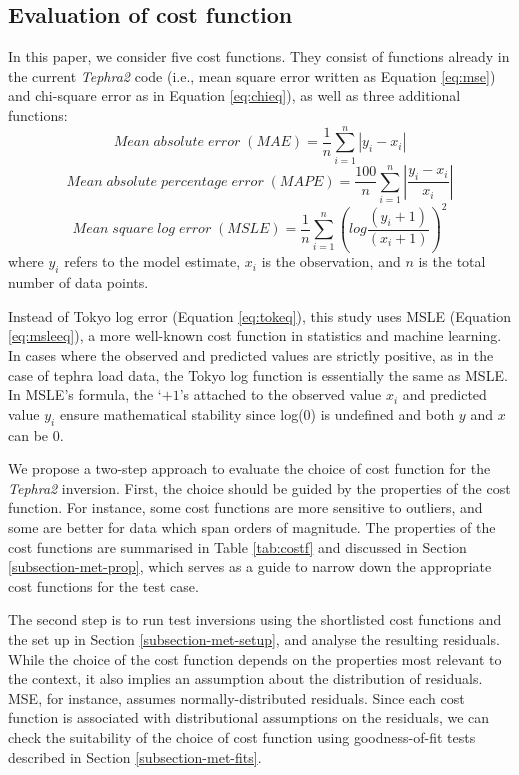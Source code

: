 \documentclass[a4paper,fleqn]{cas-sc}
\begin{document}
\subsection{Evaluation of cost function}\label{subsection-met-eval}

In this paper, we consider five cost functions. They consist of functions already in the current \textit{Tephra2} code (i.e., mean square error written as Equation \ref{eq:mse}) and chi-square error as in Equation \ref{eq:chieq}), as well as three additional functions:
\begin{equation}
Mean\;absolute\;error\;(MAE) = \frac{1}{n} \sum_{i=1}^{n} |y_{i} - x_{i}|
\end{equation}
\begin{equation}
Mean\;absolute\;percentage\;error\;(MAPE) = \frac{100}{n} \sum_{i=1}^{n} \left | \frac{y_{i} - x_{i}}{x_{i}} \right|
\end{equation}
\begin{equation}
Mean\;square\;log\;error\;(MSLE) = \frac{1}{n} \sum_{i=1}^{n}\left (log \frac{(y_{i}+1) }{(x_{i}+1)}\right )^2 \label{eq:msleeq}
\end{equation} 
 where $y_{i}$ refers to the model estimate, $x_{i}$ is the observation, and $n$ is the total number of data points.

Instead of Tokyo log error (Equation \ref{eq:tokeq}), this study uses MSLE (Equation \ref{eq:msleeq}), a more well-known cost function in statistics and machine learning. In cases where the observed and predicted values are strictly positive, as in the case of tephra load data, the Tokyo log function is essentially the same as MSLE. In MSLE's formula, the `$+1$'s attached to the observed value $x_{i}$ and predicted value $y_{i}$ ensure mathematical stability since log(0) is undefined and both $y$ and $x$ can be 0. 

We propose a two-step approach to evaluate the choice of cost function for the \textit{Tephra2} inversion. First, the choice should be guided by the properties of the cost function. For instance, some cost functions are more sensitive to outliers, and some are better for data which span orders of magnitude. The properties of the cost functions are summarised in Table \ref{tab:costf} and discussed in Section \ref{subsection-met-prop}, which serves as a guide to narrow down the appropriate cost functions for the test case.

The second step is to run test inversions using the shortlisted cost functions and the set up in Section \ref{subsection-met-setup}, and analyse the resulting residuals. While the choice of the cost function depends on the properties most relevant to the context, it also implies an assumption about the distribution of residuals. MSE, for instance, assumes normally-distributed residuals. Since each cost function is associated with distributional assumptions on the residuals, we can check the suitability of the choice of cost function using goodness-of-fit tests described in Section \ref{subsection-met-fits}. 
\end{document}
